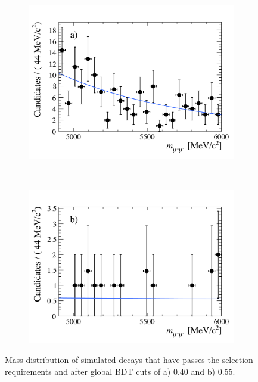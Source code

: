 \begin{figure}[tbp]
    \centering
    \begin{subfigure}[b]{0.48\textwidth}
        \includegraphics[width=\textwidth]{./Figs/Selection/BDT0p4.pdf}
    \end{subfigure}
    ~ %
    \begin{subfigure}[b]{0.48\textwidth}
       \includegraphics[width=\textwidth]{./Figs/Selection/BDT0p55.pdf}
    \end{subfigure}
    \caption{Mass distribution of \bbarmumux simulated decays that have passes the \bsmumu \el selection requirements and after global BDT cuts of a) 0.40 and b) 0.55.}
    \label{fig:BDTmasses}
\end{figure}


